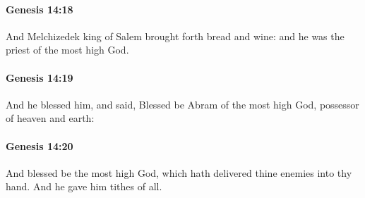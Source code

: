 		\paragraph{Genesis 14:18} %
			\label{GENESIS-14-18}

			And Melchizedek king of Salem brought forth bread and wine: and he was the priest of the most high God.


		\paragraph{Genesis 14:19} %
			\label{GENESIS-14-19}

			And he blessed him, and said, Blessed be Abram of the most high God, possessor of heaven and earth:


		\paragraph{Genesis 14:20} %
			\label{GENESIS-14-20}

			And blessed be the most high God, which hath delivered thine enemies into thy hand.  And he gave him tithes of all.


